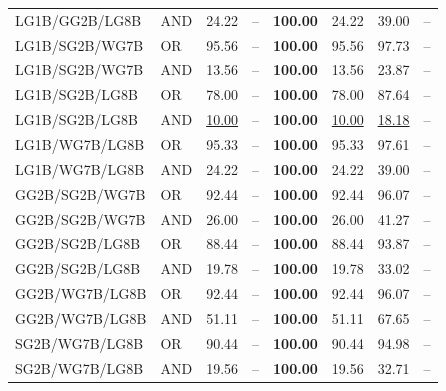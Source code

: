 \documentclass{article}
\begin{document}
{\begin{longtable}{llrrrrrr}
 LG1B/GG2B/LG8B           & AND     & 24.22             & --            & \textbf{100.00} & 24.22             & 39.00             & --    \\
 LG1B/SG2B/WG7B           & OR      & 95.56             & --            & \textbf{100.00} & 95.56             & 97.73             & --    \\
 LG1B/SG2B/WG7B           & AND     & 13.56             & --            & \textbf{100.00} & 13.56             & 23.87             & --    \\
 LG1B/SG2B/LG8B           & OR      & 78.00             & --            & \textbf{100.00} & 78.00             & 87.64             & --    \\
 LG1B/SG2B/LG8B           & AND     & \underline{10.00} & --            & \textbf{100.00} & \underline{10.00} & \underline{18.18} & --    \\
 LG1B/WG7B/LG8B           & OR      & 95.33             & --            & \textbf{100.00} & 95.33             & 97.61             & --    \\
 LG1B/WG7B/LG8B           & AND     & 24.22             & --            & \textbf{100.00} & 24.22             & 39.00             & --    \\
 GG2B/SG2B/WG7B           & OR      & 92.44             & --            & \textbf{100.00} & 92.44             & 96.07             & --    \\
 GG2B/SG2B/WG7B           & AND     & 26.00             & --            & \textbf{100.00} & 26.00             & 41.27             & --    \\
 GG2B/SG2B/LG8B           & OR      & 88.44             & --            & \textbf{100.00} & 88.44             & 93.87             & --    \\
 GG2B/SG2B/LG8B           & AND     & 19.78             & --            & \textbf{100.00} & 19.78             & 33.02             & --    \\
 GG2B/WG7B/LG8B           & OR      & 92.44             & --            & \textbf{100.00} & 92.44             & 96.07             & --    \\
 GG2B/WG7B/LG8B           & AND     & 51.11             & --            & \textbf{100.00} & 51.11             & 67.65             & --    \\
 SG2B/WG7B/LG8B           & OR      & 90.44             & --            & \textbf{100.00} & 90.44             & 94.98             & --    \\
 SG2B/WG7B/LG8B           & AND     & 19.56             & --            & \textbf{100.00} & 19.56             & 32.71             & --    \\

\end{longtable}}
\end{document}
